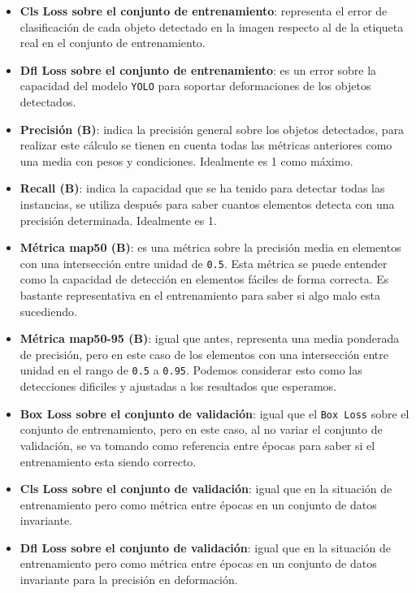 \begin{itemize}
    \item \textbf{Cls Loss sobre el conjunto de entrenamiento}: representa el error de clasificación de cada objeto detectado en la imagen respecto al de la etiqueta real en el conjunto de entrenamiento.
    \item \textbf{Dfl Loss sobre el conjunto de entrenamiento}: es un error sobre la capacidad del modelo \texttt{YOLO} para soportar deformaciones de los objetos detectados.
    \item \textbf{Precisión (B)}: indica la precisión general sobre los objetos detectados, para realizar este cálculo se tienen en cuenta todas las métricas anteriores como una media con pesos y condiciones. Idealmente es 1 como máximo.
    \item \textbf{Recall (B)}: indica la capacidad que se ha tenido para detectar todas las instancias, se utiliza después para saber cuantos elementos detecta con una precisión determinada. Idealmente es 1.
    \item \textbf{Métrica \acrshort{map}50 (B)}: es una métrica sobre la precisión media en elementos con una intersección entre unidad de \texttt{0.5}. Esta métrica se puede entender como la capacidad de detección 
    en elementos fáciles de forma correcta. Es bastante representativa en el entrenamiento para saber si algo malo esta sucediendo.
    \item \textbf{Métrica \acrshort{map}50-95 (B)}: igual que antes, representa una media ponderada de precisión, pero en este caso de los elementos con una intersección entre unidad en el rango de \texttt{0.5} a 
    \texttt{0.95}. Podemos considerar esto como las detecciones dificiles y ajustadas a los resultados que esperamos.
    \item \textbf{Box Loss sobre el conjunto de validación}: igual que el \texttt{Box Loss} sobre el conjunto de entrenamiento, pero en este caso, al no variar el conjunto de validación, se va tomando como referencia 
    entre épocas para saber si el entrenamiento esta siendo correcto.
    \item \textbf{Cls Loss sobre el conjunto de validación}: igual que en la situación de entrenamiento pero como métrica entre épocas en un conjunto de datos invariante.
    \item \textbf{Dfl Loss sobre el conjunto de validación}: igual que en la situación de entrenamiento pero como métrica entre épocas en un conjunto de datos invariante para la precisión en deformación.
\end{itemize}

